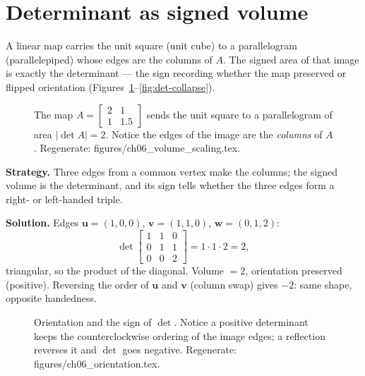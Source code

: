 \section{Determinant as signed volume}\label{sec:det-volume}

A linear map carries the unit square (unit cube) to a parallelogram
(parallelepiped) whose edges are the columns of $A$. The signed area of
that image is exactly the determinant --- the sign recording whether the
map preserved or flipped orientation
(Figures~\ref{fig:det-scaling}--\ref{fig:det-collapse}).

\begin{figure}[htbp]
\centering

\caption{The map $A=\begin{bmatrix}2&1\\1&1.5\end{bmatrix}$ sends the unit
square to a parallelogram of area $|\det A|=2$. Notice the edges of the
image are the \emph{columns} of $A$. Regenerate:
\ttfamily figures/ch06\_volume\_scaling.tex.}
\label{fig:det-scaling}
\end{figure}

\begin{example}\label{ex:detvol}
\textbf{Strategy.} Three edges from a common vertex make the columns;
the signed volume is the determinant, and its sign tells whether the
three edges form a right- or left-handed triple.

\textbf{Solution.} Edges $\mathbf u=(1,0,0)$, $\mathbf v=(1,1,0)$,
$\mathbf w=(0,1,2)$:
\[
\det\begin{bmatrix}1&1&0\\0&1&1\\0&0&2\end{bmatrix}=1\cdot1\cdot2=2,
\]
triangular, so the product of the diagonal. Volume $=2$, orientation
preserved (positive). Reversing the order of $\mathbf u$ and $\mathbf v$
(column swap) gives $-2$: same shape, opposite handedness.
\end{example}

\begin{figure}[htbp]
\centering

\caption{Orientation and the sign of $\det$. Notice a positive determinant
keeps the counterclockwise ordering of the image edges; a reflection
reverses it and $\det$ goes negative. Regenerate:
\ttfamily figures/ch06\_orientation.tex.}
\label{fig:det-orientation}
\end{figure}

